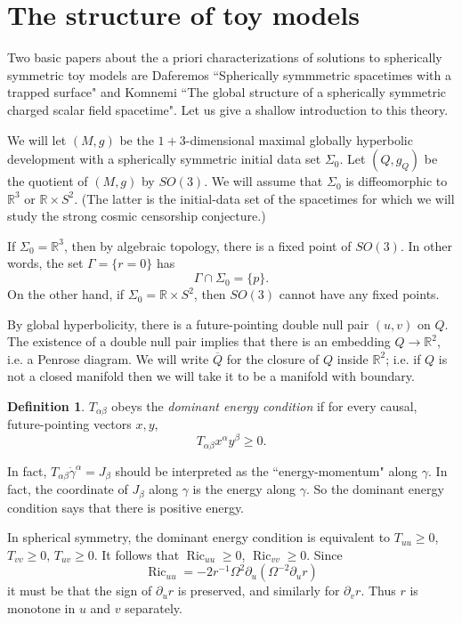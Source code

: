 \documentclass[12pt]{report}
\newcommand{\RR}{\mathbb{R}}
\newcommand{\Ric}{\operatorname{Ric}}
\newcommand{\dfn}[1]{\emph{#1}\index{#1}}
\theoremstyle{definition}
\newtheorem{definition}[theorem]{Definition}
\begin{document}
\section{The structure of toy models}
    Two basic papers about the a priori characterizations of solutions to spherically symmetric toy models are Daferemos ``Spherically symmmetric spacetimes with a trapped surface" and Komnemi ``The global structure of a spherically symmetric charged scalar field spacetime". Let us give a shallow introduction to this theory.

    We will let $(M, g)$ be the $1+3$-dimensional maximal globally hyperbolic development with a spherically symmetric initial data set $\Sigma_0$. Let $(Q, g_Q)$ be the quotient of $(M, g)$ by $SO(3)$. We will assume that $\Sigma_0$ is diffeomorphic to $\RR^3$ or $\RR \times S^2$. (The latter is the initial-data set of the spacetimes for which we will study the strong cosmic censorship conjecture.)

    If $\Sigma_0 = \RR^3$, then by algebraic topology, there is a fixed point of $SO(3)$. In other words, the set $\Gamma = \{r = 0\}$ has
    $$\Gamma \cap \Sigma_0 = \{p\}.$$
    On the other hand, if $\Sigma_0 = \RR \times S^2$, then $SO(3)$ cannot have any fixed points.

    By global hyperbolicity, there is a future-pointing double null pair $(u, v)$ on $Q$. The existence of a double null pair implies that there is an embedding $Q \to \RR^2$, i.e. a Penrose diagram. We will write $\overline Q$ for the closure of $Q$ inside $\RR^2$; i.e. if $Q$ is not a closed manifold then we will take it to be a manifold with boundary.

\begin{definition}
    $T_{\alpha\beta}$ obeys the \dfn{dominant energy condition} if for every causal, future-pointing vectors $x, y$,
    $$T_{\alpha\beta}x^\alpha y^\beta \geq 0.$$
\end{definition}
    In fact, $T_{\alpha\beta} \dot \gamma^\alpha = J_\beta$ should be interpreted as the ``energy-momentum" along $\gamma$. In fact, the coordinate of $J_\beta$ along $\gamma$ is the energy along $\gamma$. So the dominant energy condition says that there is positive energy.

    In spherical symmetry, the dominant energy condition is equivalent to $T_{uu} \geq 0$, $T_{vv} \geq 0$, $T_{uv} \geq 0$. It follows that $\Ric_{uu} \geq 0$, $\Ric_{vv} \geq 0$. Since
    $$\Ric_{uu} = -2r^{-1}\Omega^2 \partial_u (\Omega^{-2}\partial_ur)$$
    it must be that the sign of $\partial_ur$ is preserved, and similarly for $\partial_vr$. Thus $r$ is monotone in $u$ and $v$ separately.
\end{document}
